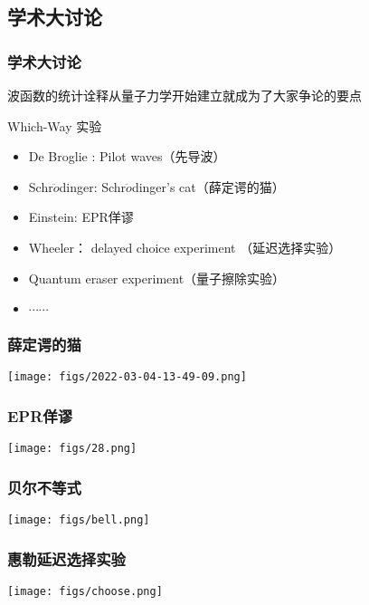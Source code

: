  \subsection{学术大讨论}
 \begin{frame}
     \frametitle{学术大讨论}
     波函数的统计诠释从量子力学开始建立就成为了大家争论的要点
     \begin{atcbox}{Which-Way 实验}
     \begin{itemize}
          \item De Broglie : Pilot waves（先导波）
          \item Schr$\ddot{o}$dinger: Schr$\ddot{o}$dinger's cat（薛定谔的猫）
          \item Einstein: EPR佯谬
          \item Wheeler： delayed choice experiment （延迟选择实验）
          \item Quantum eraser experiment（量子擦除实验）
          \item $\cdots \cdots$
     \end{itemize}
     \end{atcbox}
 \end{frame}
 
 \begin{frame}
     \frametitle{薛定谔的猫}
     \begin{center}
         \texttt{[image: figs/2022-03-04-13-49-09.png]} \\
     \end{center} 
 \end{frame}
 
 \begin{frame}
     \frametitle{EPR佯谬}
     \begin{center}
         \texttt{[image: figs/28.png]} \\
     \end{center} 
 \end{frame}
 
 \begin{frame}
     \frametitle{贝尔不等式}
     \begin{center}
         \texttt{[image: figs/bell.png]} \\
     \end{center} 
 \end{frame}
 
 \begin{frame}
     \frametitle{惠勒延迟选择实验}
     \begin{center}
         \texttt{[image: figs/choose.png]} \\
     \end{center} 
 \end{frame}
 
